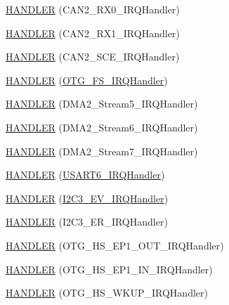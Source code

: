 \begin{DoxyCompactItemize}
\item 
\hyperlink{group___p_i_o_s_ga2e8f3f3c4b79dedbfc64bd6303fde94a}{H\-A\-N\-D\-L\-E\-R} (C\-A\-N2\-\_\-\-R\-X0\-\_\-\-I\-R\-Q\-Handler)
\item 
\hyperlink{group___p_i_o_s_ga92aa6d0570148148f28d084240182be1}{H\-A\-N\-D\-L\-E\-R} (C\-A\-N2\-\_\-\-R\-X1\-\_\-\-I\-R\-Q\-Handler)
\item 
\hyperlink{group___p_i_o_s_gad32a556af377661534f4ec502a087681}{H\-A\-N\-D\-L\-E\-R} (C\-A\-N2\-\_\-\-S\-C\-E\-\_\-\-I\-R\-Q\-Handler)
\item 
\hyperlink{group___p_i_o_s_gafcfcd1e017eeb75287de863ab8a1478a}{H\-A\-N\-D\-L\-E\-R} (\hyperlink{group___p_i_o_s___u_s_b_h_o_o_k_ga75135d7a041e2932e9903e8a345b3fc4}{O\-T\-G\-\_\-\-F\-S\-\_\-\-I\-R\-Q\-Handler})
\item 
\hyperlink{group___p_i_o_s_ga1f64cc7d597320a5204bb47080011574}{H\-A\-N\-D\-L\-E\-R} (D\-M\-A2\-\_\-\-Stream5\-\_\-\-I\-R\-Q\-Handler)
\item 
\hyperlink{group___p_i_o_s_ga108b995e36b02ef3e15f87fc683f1786}{H\-A\-N\-D\-L\-E\-R} (D\-M\-A2\-\_\-\-Stream6\-\_\-\-I\-R\-Q\-Handler)
\item 
\hyperlink{group___p_i_o_s_ga49402f17f34d2b768b0ed14c97136ce8}{H\-A\-N\-D\-L\-E\-R} (D\-M\-A2\-\_\-\-Stream7\-\_\-\-I\-R\-Q\-Handler)
\item 
\hyperlink{group___p_i_o_s_ga962e492fca169f575b163bb0bacdc03d}{H\-A\-N\-D\-L\-E\-R} (\hyperlink{group___p_i_o_s___u_s_a_r_t_ga12c827857d907ad0cccd586fd934d446}{U\-S\-A\-R\-T6\-\_\-\-I\-R\-Q\-Handler})
\item 
\hyperlink{group___p_i_o_s_ga9a88bd32032026c57ae5f7685f0e86ae}{H\-A\-N\-D\-L\-E\-R} (\hyperlink{group___tau_labs_core_ga749eb918c398cc3f11f47ec317757573}{I2\-C3\-\_\-\-E\-V\-\_\-\-I\-R\-Q\-Handler})
\item 
\hyperlink{group___p_i_o_s_ga8cd90e3b30cdf4d3e7a4fc9022768fcf}{H\-A\-N\-D\-L\-E\-R} (I2\-C3\-\_\-\-E\-R\-\_\-\-I\-R\-Q\-Handler)
\item 
\hyperlink{group___p_i_o_s_ga55d1c6dae88d8aa9ae24b07010113ca9}{H\-A\-N\-D\-L\-E\-R} (O\-T\-G\-\_\-\-H\-S\-\_\-\-E\-P1\-\_\-\-O\-U\-T\-\_\-\-I\-R\-Q\-Handler)
\item 
\hyperlink{group___p_i_o_s_gaf10d7571fc1c39118b6a0a779f18f7a3}{H\-A\-N\-D\-L\-E\-R} (O\-T\-G\-\_\-\-H\-S\-\_\-\-E\-P1\-\_\-\-I\-N\-\_\-\-I\-R\-Q\-Handler)
\item 
\hyperlink{group___p_i_o_s_ga3b875f3bd65fd974cf4e8b29b2d71b97}{H\-A\-N\-D\-L\-E\-R} (O\-T\-G\-\_\-\-H\-S\-\_\-\-W\-K\-U\-P\-\_\-\-I\-R\-Q\-Handler)

\end{DoxyCompactItemize}
